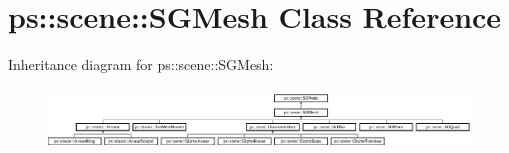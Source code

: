 \hypertarget{classps_1_1scene_1_1SGMesh}{}\section{ps\+:\+:scene\+:\+:S\+G\+Mesh Class Reference}
\label{classps_1_1scene_1_1SGMesh}
Inheritance diagram for ps\+:\+:scene\+:\+:S\+G\+Mesh\+:\begin{figure}[H]
\begin{center}
\leavevmode
\includegraphics[height=1.627907cm]{classps_1_1scene_1_1SGMesh}
\end{center}
\end{figure}
